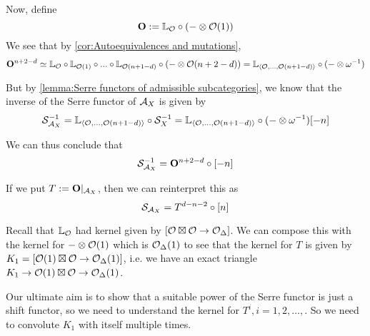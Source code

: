 Now, define $$\mathbf{O}:=\mathbb{L}_{\mathcal{O}} \circ (-\otimes \mathcal{O}(1))$$
We see that by \ref{cor:Autoequivalences and mutations}, $$\mathbf{O}^{n+2-d}\simeq \mathbb{L}_{\mathcal{O}} \circ \mathbb{L}_{\mathcal{O}(1)}\circ ... \circ \mathbb{L}_{\mathcal{O}(n+1-d)}\circ (-\otimes \mathcal{O}(n+2-d))=\mathbb{L}_{\langle \mathcal{O}, \dots, \mathcal{O}(n+1-d) \rangle} \circ (-\otimes \omega ^{-1})$$

But by \ref{lemma:Serre functors of admissible subcategories}, we know that the inverse of the Serre functor of $\mathcal{A}_X$ is given by $$\mathcal{S}_{\mathcal{A}_X}^{-1} =  \mathbb{L}_{\langle \mathcal{O}, \dots, \mathcal{O}(n+1-d) \rangle} \circ \mathcal{S}_X ^{-1}=\mathbb{L}_{\langle \mathcal{O}, \dots, \mathcal{O}(n+1-d) \rangle} \circ (-\otimes \omega^{-1})[-n]$$

We can thus conclude that $$\mathcal{S}_{\mathcal{A}_X}^{-1} = \mathbf{O}^{n+2-d}\circ [-n]$$

If we put $T:=\mathbf{O}|_{\mathcal{A}_X}$, then we can reinterpret this as $$\mathcal{S}_{\mathcal{A}_X}=T^{d-n-2}\circ [n]$$

Recall that $\mathbb{L}_{\mathcal{O}}$ had kernel given by $[\mathcal{O} \boxtimes \mathcal{O} \rightarrow \mathcal{O}_\Delta]$. We can compose this with the kernel for $-\otimes \mathcal{O}(1)$ which is $\mathcal{O}_\Delta(1)$ to see that the kernel for $T$ is given by $K_1=[\mathcal{O}(1)\boxtimes \mathcal{O} \rightarrow \mathcal{O}_\Delta(1)]$, i.e. we have an exact triangle $K_1 \rightarrow  \mathcal{O}(1)\boxtimes \mathcal{O} \rightarrow \mathcal{O}_\Delta(1)$. 

Our ultimate aim is to show that a suitable power of the Serre functor is just a shift functor, so we need to understand the kernel for $T^i, i=1,2,\dots, $. So we need to convolute $K_1$ with itself multiple times. 


